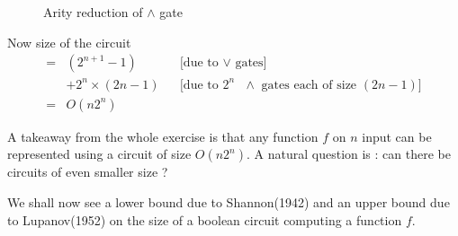 \begin{figure}[htp!]
\centering

\caption{Arity reduction of $\land$ gate}
\label{figure5}
\end{figure}

Now size of the circuit 
\begin{align*}
= &   (2^{n+1}-1)  && \text{[due to $\lor$ gates]} \\ 
  & + 2^n \times (2n-1) && \text{[due to $2^n$ $\land$ 
  gates each of size $(2n-1)$]} \\
  =&  O(n 2^n) 
\end{align*}

A takeaway from the whole exercise is that any function $f$ on $n$ input can
be represented using a circuit of size $O(n2^n)$.
A natural question is : can there be circuits of even smaller size ?

We shall now see a lower bound due to Shannon(1942) and an upper bound due to
Lupanov(1952) on the size of a boolean circuit computing a function $f$.

